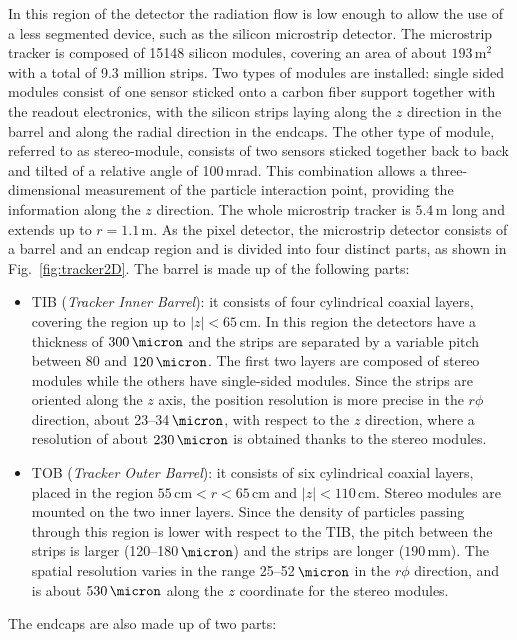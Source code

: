 In this region of the detector the radiation flow is low enough to allow the use of a less segmented device, such as the silicon microstrip detector.
The microstrip tracker is composed of 15148 silicon modules, covering an area of about $193\,\mathrm{m^2}$ with a total of 9.3 million strips. Two types of modules are installed: single sided modules consist of one sensor sticked onto a carbon fiber support together with the readout electronics, with the silicon strips laying along the $z$ direction in the barrel and along the radial direction in the endcaps. The other type of module, referred to as stereo-module, consists of two sensors sticked together back to back and tilted of a relative angle of 100\,mrad. This combination allows a three-dimensional measurement of the particle interaction point, providing the information along the $z$ direction. The whole microstrip tracker is $5.4$\,m long and extends up to $r=1.1$\,m. As the pixel detector, the microstrip detector consists of a barrel and an endcap region and is divided into four distinct parts, as shown in Fig.~\ref{fig:tracker2D}. The barrel is made up of the following parts:
\begin{itemize}
\item TIB (\emph{Tracker Inner Barrel}): it consists of four cylindrical coaxial layers, covering the region up to $|z|<65$\,cm. In this region the detectors have a thickness of $300\,\micron$ and the strips are separated by a variable pitch between 80 and $120\,\micron$. The first two layers are composed of stereo modules while the others have single-sided modules. Since the strips are oriented along the $z$ axis, the position resolution is more precise in the $r\phi$ direction, about 23--34$\,\micron$, with respect to the $z$ direction, where a resolution of about $230\,\micron$ is obtained thanks to the stereo modules.
\item TOB (\emph{Tracker Outer Barrel}): it consists of six cylindrical coaxial layers, placed in the region $55\,\mathrm{cm} < r < 65\,\mathrm{cm}$ and $|z|<110$\,cm. Stereo modules are mounted on the two inner layers. Since the density of particles passing through this region is lower with respect to the TIB, the pitch between the strips is larger (120--180$\,\micron$) and the strips are longer ($190$\,mm). The spatial resolution varies in the range 25--52$\,\micron$ in the $r\phi$ direction, and is about $530\,\micron$ along the $z$ coordinate for the stereo modules.
\end{itemize}
The endcaps are also made up of two parts:
